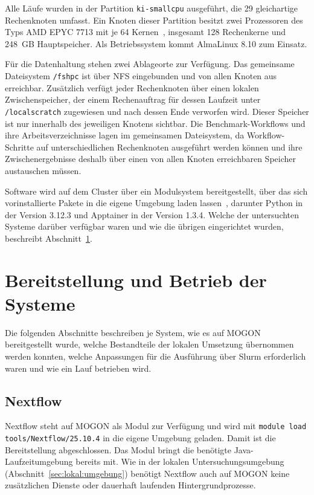 Alle Läufe wurden in der Partition \texttt{ki-smallcpu} ausgeführt,
die 29 gleichartige Rechenknoten umfasst. Ein Knoten dieser
Partition besitzt zwei Prozessoren des Typs AMD EPYC 7713 mit je 64
Kernen~\cite{mogonnhr}, insgesamt 128 Rechenkerne und 248~GB
Hauptspeicher. Als Betriebssystem kommt AlmaLinux 8.10 zum Einsatz.

Für die Datenhaltung stehen zwei Ablageorte zur Verfügung. Das
gemeinsame Dateisystem \texttt{/fshpc} ist über NFS eingebunden und von allen Knoten aus erreichbar. Zusätzlich
verfügt jeder Rechenknoten über einen lokalen Zwischenspeicher, der
einem Rechenauftrag für dessen Laufzeit unter
\texttt{/localscratch} zugewiesen und nach dessen Ende verworfen
wird. Dieser Speicher ist nur innerhalb des jeweiligen Knotens
sichtbar. Die Benchmark-Workflows und ihre Arbeitsverzeichnisse
lagen im gemeinsamen Dateisystem, da Workflow-Schritte auf
unterschiedlichen Rechenknoten ausgeführt werden können und ihre
Zwischenergebnisse deshalb über einen von allen Knoten
erreichbaren Speicher austauschen müssen.

Software wird auf dem Cluster über ein Modulsystem bereitgestellt,
über das sich vorinstallierte Pakete in die eigene Umgebung laden
lassen~\cite{mogondocs}, darunter Python in der Version 3.12.3 und
Apptainer in der Version 1.3.4. Welche der untersuchten Systeme
darüber verfügbar waren und wie die übrigen eingerichtet wurden,
beschreibt Abschnitt~\ref{sec:mogon:bereitstellung}.


\section{Bereitstellung und Betrieb der Systeme}
\label{sec:mogon:bereitstellung}

Die folgenden Abschnitte beschreiben je System, wie es auf MOGON
bereitgestellt wurde, welche Bestandteile der lokalen Umsetzung
übernommen werden konnten, welche Anpassungen für die Ausführung
über Slurm erforderlich waren und wie ein Lauf betrieben wird.
\subsection{Nextflow}
\label{sec:mogon:nextflow}

Nextflow steht auf MOGON als Modul zur Verfügung und wird mit
\texttt{module load tools/Nextflow/25.10.4} in die eigene Umgebung
geladen. Damit ist die Bereitstellung abgeschlossen. Das Modul
bringt die benötigte Java-Laufzeitumgebung bereits mit. Wie in der
lokalen Untersuchungsumgebung
(Abschnitt~\ref{sec:lokal:umgebung}) benötigt Nextflow auch auf
MOGON keine zusätzlichen Dienste oder dauerhaft laufenden
Hintergrundprozesse.

